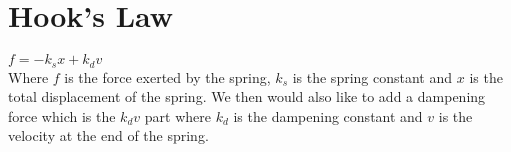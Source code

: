 \section{Hook's Law}

$ f = -k _s x + k _d v$\\
Where $f$ is the force exerted by the spring, $k _s$ is the spring constant and $x$ is the total displacement of the spring. We then would also like to add a dampening force which is the $k _d v$ part where $k _d$ is the dampening constant and $v$ is the velocity at the end of the spring.\\
